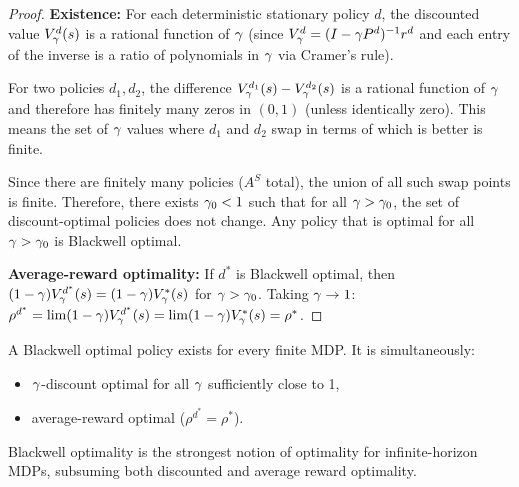 \documentclass[11pt,a4paper]{article}
\begin{document}
\begin{proof}
\textbf{Existence:} For each deterministic stationary policy $d$, the
discounted value $V^d_\gamma(s)$ is a rational function of
$\gamma$ (since $V^d_\gamma = (I - \gamma P^d)^{-1} r^d$
and each entry of the inverse is a ratio of polynomials in $\gamma$
via Cramer's rule).

For two policies $d_1, d_2$, the difference
$V^{d_1}_\gamma(s) - V^{d_2}_\gamma(s)$ is a rational function
of $\gamma$ and therefore has finitely many zeros in $(0,1)$
(unless identically zero). This means the set of $\gamma$ values
where $d_1$ and $d_2$ swap in terms of which is better is finite.

Since there are finitely many policies ($A^S$ total), the union of
all such swap points is finite. Therefore, there exists
$\gamma_0 < 1$ such that for all $\gamma > \gamma_0$, the
set of discount-optimal policies does not change. Any policy that is
optimal for all $\gamma > \gamma_0$ is Blackwell optimal.

\textbf{Average-reward optimality:} If $d^*$ is Blackwell optimal,
then $(1-\gamma) V^{d^*}_\gamma(s) =
(1-\gamma) V^*_\gamma(s)$ for $\gamma > \gamma_0$.
Taking $\gamma \to 1$:
$\rho^{d^*} = \lim (1-\gamma) V^{d^*}_\gamma(s) =
\lim (1-\gamma) V^*_\gamma(s) = \rho^*$.
\end{proof}

\begin{keyresult}[title={Blackwell Optimality}]
A Blackwell optimal policy exists for every finite MDP. It is
simultaneously:
\begin{itemize}[nosep]
    \item $\gamma$-discount optimal for all $\gamma$
    sufficiently close to 1,
    \item average-reward optimal ($\rho^{d^*} = \rho^*$).
\end{itemize}
Blackwell optimality is the strongest notion of optimality for
infinite-horizon MDPs, subsuming both discounted and average reward
optimality.
\end{keyresult}
\end{document}
